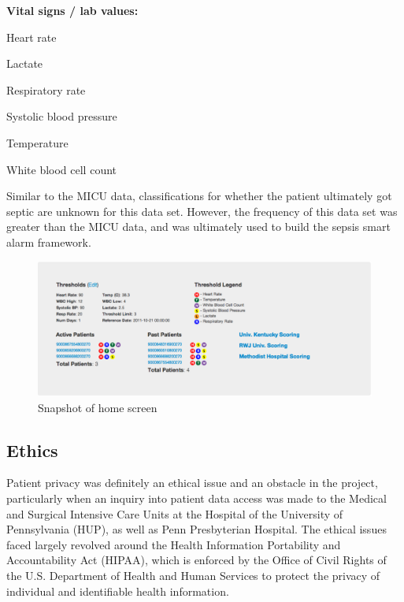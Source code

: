 \documentclass{sig-alternate}
\begin{document}
\noindent \textbf{Vital signs / lab values:}
\begin{itemize*}
  \item Heart rate
  \item Lactate
  \item Respiratory rate
  \item Systolic blood pressure
  \item Temperature
  \item White blood cell count
\end{itemize*}

Similar to the MICU data, classifications for whether the patient ultimately got septic are unknown for this data set.  However, the frequency of this data set was greater than the MICU data, and was ultimately used to build the sepsis smart alarm framework.  

\begin{figure}
	\begin{center}
		\includegraphics[width=1.0\linewidth]{home.png}
	\end{center}
	\caption{Snapshot of home screen}
	\label{fig:home}
\end{figure}

\vspace{10pt}
\subsection{Ethics}
\label{subsec:ethics}
\vspace{10pt}

Patient privacy was definitely an ethical issue and an obstacle in the project, particularly when an inquiry into patient data access was made to the Medical and Surgical Intensive Care Units at the Hospital of the University of Pennsylvania (HUP), as well as Penn Presbyterian Hospital. The ethical issues faced largely revolved around the Health Information Portability and Accountability Act (HIPAA), which is enforced by the Office of Civil Rights of the U.S. Department of Health and Human Services to protect the privacy of individual and identifiable health information.
\end{document}
